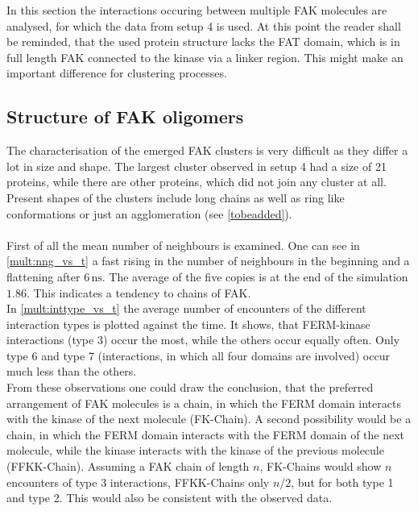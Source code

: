 In this section the interactions occuring between multiple FAK molecules are analysed, for which the data from setup 4 is used. At this point the reader shall be reminded, that the used protein structure lacks the FAT domain, which is in full length FAK connected to the kinase via a linker region. This might make an important difference for clustering processes.
\subsection{Structure of FAK oligomers}
\label{mult:oligs}
The characterisation of the emerged FAK clusters is very difficult as they differ a lot in size and shape. The largest cluster observed in setup 4 had a size of 21 proteins, while there are other proteins, which did not join any cluster at all. Present shapes of the clusters include long chains as well as ring like conformations or just an agglomeration (see \autoref{tobeadded}). \\
\\
First of all the mean number of neighbours is examined. One can see in \autoref{mult:nng_vs_t} a fast rising in the number of neighbours in the beginning and a flattening after $6\,\si{\nano\second}$. The average of the five copies is at the end of the simulation $1.86$. This indicates a tendency to chains of FAK.\\
In \autoref{mult:inttype_vs_t} the average number of encounters of the different interaction types is plotted against the time. It shows, that FERM-kinase interactions (type 3) occur the most, while the others occur equally often. Only type 6 and type 7 (interactions, in which all four domains are involved) occur much less than the others.\\
From these observations one could draw the conclusion, that the preferred arrangement of FAK molecules is a chain, in which the FERM domain interacts with the kinase of the next molecule (FK-Chain). A second possibility would be a chain, in which the FERM domain interacts with the FERM domain of the next molecule, while the kinase interacts with the kinase of the previous molecule (FFKK-Chain). Assuming a FAK chain of length $n$, FK-Chains would show $n$ encounters of type 3 interactions, FFKK-Chains only $n/2$, but for both type 1 and type 2. This would also be consistent with the observed data.
%
%
%
